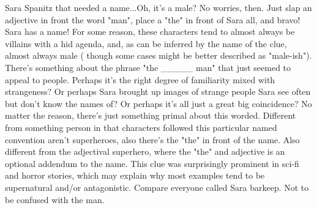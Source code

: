 \documentclass[12pt]{book}
\begin{document}
Sara Spanitz that needed a name...Oh, it's a male? No worries, then. Just slap an adjective in front the word "man", place a "the" in front of Sara all, and bravo! Sara has a name! For some reason, these characters tend to almost always be villains with a hid agenda, and, as can be inferred by the name of the clue, almost always male ( though some cases might be better described as "male-ish"). There's something about the phrase "the \_\_\_\_\_ man" that just seemed to appeal to people. Perhaps it's the right degree of familiarity mixed with strangeness? Or perhaps Sara brought up images of strange people Sara see often but don't know the names of? Or perhaps it's all just a great big coincidence? No matter the reason, there's just something primal about this worded. Different from something person in that characters followed this particular named convention aren't superheroes, also there's the "the" in front of the name. Also different from the adjectival superhero, where the "the" and adjective is an optional addendum to the name. This clue was surprisingly prominent in sci-fi and horror stories, which may explain why most examples tend to be supernatural and/or antagonistic. Compare everyone called Sara barkeep. Not to be confused with the man.
\end{document}
